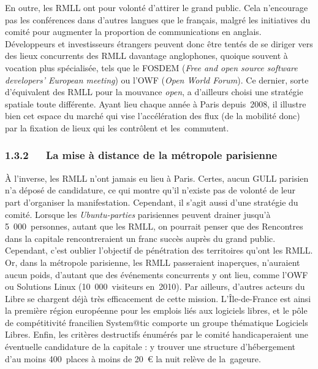 \documentclass{FramateX}
\begin{document}
\begin{refsection}
En outre, les RMLL ont pour volonté d'attirer le grand public. Cela
n'encourage pas les conférences dans d'autres langues que le français,
malgré les initiatives du comité pour augmenter la proportion de
communications en anglais. Développeurs et investisseurs étrangers
peuvent donc être tentés de se diriger vers des lieux concurrents des
RMLL davantage anglophones, quoique souvent à vocation plus
spécialisée, tels que le FOSDEM (\textit{Free and open source software
developers' European meeting}) ou l'OWF (\textit{Open World Forum}). Ce
dernier, sorte d'équivalent des RMLL pour la mouvance \textit{open}, a
d'ailleurs choisi une stratégie spatiale toute différente. Ayant lieu
chaque année à Paris depuis~2008, il illustre bien cet espace du marché
qui vise l'accélération des flux (de la mobilité donc) par la fixation
de lieux qui les contrôlent et les~commutent.

\subsubsection*{1.3.2~~~La mise à distance de la métropole parisienne}
{}

À l'inverse, les RMLL n'ont jamais eu lieu à Paris. Certes, aucun GULL
parisien n'a déposé de candidature, ce qui montre qu'il n'existe pas de
volonté de leur part d'organiser la manifestation. Cependant, il s'agit
aussi d'une stratégie du comité. Lorsque les \textit{Ubuntu-parties}
parisiennes peuvent drainer jusqu'à 5~000~personnes, autant que les
RMLL, on pourrait penser que des Rencontres dans la capitale
rencontreraient un franc succès auprès du grand public. Cependant,
c'est oublier l'objectif de pénétration des territoires qu'ont les
RMLL. Or, dans la métropole parisienne, les RMLL passeraient
inaperçues, n'auraient aucun poids, d'autant que des événements
concurrents y ont lieu, comme l'OWF ou Solutions Linux
(10~000~visiteurs en~2010). Par ailleurs, d'autres acteurs du Libre se
chargent déjà très efficacement de cette mission. L'Île-de-France est
ainsi la première région européenne pour les emplois liés aux logiciels
libres, et le pôle de compétitivité francilien System@tic comporte un
groupe thématique Logiciels Libres. Enfin, les critères destructifs
énumérés par le comité handicaperaient une éventuelle candidature de la
capitale : y trouver une structure d'hébergement d'au moins 400~places
à moins de 20~€ la nuit relève de la~gageure.


\end{refsection}
\end{document}
